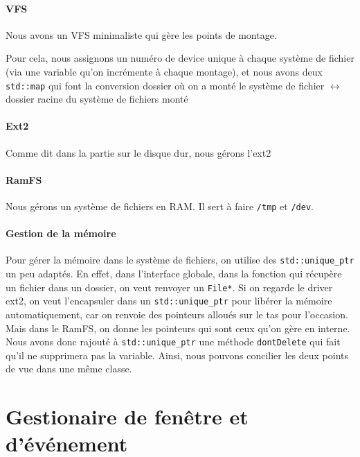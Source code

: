 \documentclass[12pt]{report}
\begin{document}
\paragraph{VFS} Nous avons un VFS minimaliste qui gère les points de montage.

Pour cela, nous assignons un numéro de device unique à chaque système de fichier (via une variable qu'on incrémente à chaque montage), et nous avons deux \verb$std::map$ qui font la conversion \og dossier où on a monté le système de fichier \fg{} $\longleftrightarrow$ \og dossier racine du système de fichiers monté \fg{}

\paragraph{Ext2} Comme dit dans la partie sur le disque dur, nous gérons l'ext2

\paragraph{RamFS} Nous gérons un système de fichiers en RAM. Il sert à faire \verb$/tmp$ et \verb$/dev$.

\paragraph{Gestion de la mémoire}
Pour gérer la mémoire dans le système de fichiers, on utilise des \verb$std::unique_ptr$ un peu adaptés.
En effet, dans l'interface globale, dans la fonction qui récupère un fichier dans un dossier, on veut renvoyer un \verb$File*$.
Si on regarde le driver ext2, on veut l'encapsuler dans un \verb$std::unique_ptr$ pour libérer la mémoire automatiquement, car on renvoie des pointeurs alloués sur le tas pour l'occasion.
Mais dans le RamFS, on donne les pointeurs qui sont ceux qu'on gère en interne.
Nous avons donc rajouté à \verb$std::unique_ptr$ une méthode \verb$dontDelete$ qui fait qu'il ne supprimera pas la variable.
Ainsi, nous pouvons concilier les deux points de vue dans une même classe.

\section{Gestionaire de fenêtre et d'événement}
\end{document}
